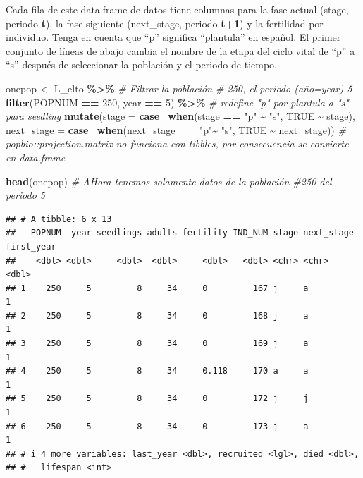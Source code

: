 \documentclass[
]{book}
\newenvironment{Shaded}{\begin{snugshade}}{\end{snugshade}}
\newcommand{\AttributeTok}[1]{\textcolor[rgb]{0.13,0.29,0.53}{#1}}
\newcommand{\CommentTok}[1]{\textcolor[rgb]{0.56,0.35,0.01}{\textit{#1}}}
\newcommand{\ConstantTok}[1]{\textcolor[rgb]{0.56,0.35,0.01}{#1}}
\newcommand{\DecValTok}[1]{\textcolor[rgb]{0.00,0.00,0.81}{#1}}
\newcommand{\FunctionTok}[1]{\textcolor[rgb]{0.13,0.29,0.53}{\textbf{#1}}}
\newcommand{\NormalTok}[1]{#1}
\newcommand{\OtherTok}[1]{\textcolor[rgb]{0.56,0.35,0.01}{#1}}
\newcommand{\SpecialCharTok}[1]{\textcolor[rgb]{0.81,0.36,0.00}{\textbf{#1}}}
\newcommand{\StringTok}[1]{\textcolor[rgb]{0.31,0.60,0.02}{#1}}
\theoremstyle{definition}
\theoremstyle{definition}
\theoremstyle{definition}
\theoremstyle{definition}
\theoremstyle{remark}
\begin{document}
Cada fila de este data.frame de datos tiene columnas para la fase actual (stage, periodo \textbf{t}), la fase siguiente (next\_stage, periodo \textbf{t+1}) y la fertilidad por individuo.
Tenga en cuenta que ``p'' significa ``plantula'' en español. El primer conjunto de líneas de abajo cambia el nombre de la etapa del ciclo vital de ``p'' a ``s'' después de seleccionar la población y el periodo de tiempo.

\begin{Shaded}
\begin{Highlighting}[]
\NormalTok{onepop }\OtherTok{\textless{}{-}}\NormalTok{ L\_elto }\SpecialCharTok{\%\textgreater{}\%}   
\CommentTok{\# Filtrar la población \# 250, el periodo (año=year) 5}
  \FunctionTok{filter}\NormalTok{(POPNUM }\SpecialCharTok{==} \DecValTok{250}\NormalTok{, year }\SpecialCharTok{==} \DecValTok{5}\NormalTok{) }\SpecialCharTok{\%\textgreater{}\%} 
  \CommentTok{\# redefine "p" por plantula a "s" para seedling}
  \FunctionTok{mutate}\NormalTok{(}\AttributeTok{stage =} \FunctionTok{case\_when}\NormalTok{(stage }\SpecialCharTok{==} \StringTok{"p"} \SpecialCharTok{\textasciitilde{}} \StringTok{"s"}\NormalTok{,}
                           \ConstantTok{TRUE} \SpecialCharTok{\textasciitilde{}}\NormalTok{ stage),}
         \AttributeTok{next\_stage =} \FunctionTok{case\_when}\NormalTok{(next\_stage }\SpecialCharTok{==} \StringTok{"p"}\SpecialCharTok{\textasciitilde{}} \StringTok{"s"}\NormalTok{,}
                                \ConstantTok{TRUE} \SpecialCharTok{\textasciitilde{}}\NormalTok{ next\_stage))}
\CommentTok{\# popbio::projection.matrix no funciona con tibbles, por consecuencia se convierte en data.frame}

\FunctionTok{head}\NormalTok{(onepop) }\CommentTok{\# AHora tenemos solamente datos de la población \#250 del periodo 5}
\end{Highlighting}
\end{Shaded}

\begin{verbatim}
## # A tibble: 6 x 13
##   POPNUM  year seedlings adults fertility IND_NUM stage next_stage first_year
##    <dbl> <dbl>     <dbl>  <dbl>     <dbl>   <dbl> <chr> <chr>           <dbl>
## 1    250     5         8     34     0         167 j     a                   1
## 2    250     5         8     34     0         168 j     a                   1
## 3    250     5         8     34     0         169 j     a                   1
## 4    250     5         8     34     0.118     170 a     a                   1
## 5    250     5         8     34     0         172 j     j                   1
## 6    250     5         8     34     0         173 j     a                   1
## # i 4 more variables: last_year <dbl>, recruited <lgl>, died <dbl>,
## #   lifespan <int>
\end{verbatim}
\end{document}
